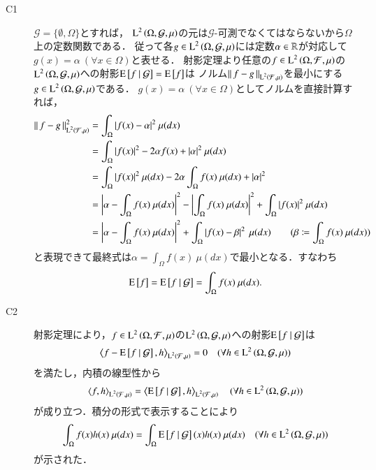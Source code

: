 	\begin{prf}
		\begin{description}
			\item[C1] $\mathcal{G} = \{\emptyset, \Omega\}$とすれば，
				$\operatorname{L}^{2} \left(\Omega, \mathcal{G},\mu\right)$の元は$\mathcal{G}$-可測でなくてはならないから$\Omega$上の定数関数である．
				従って各$g \in \operatorname{L}^{2} \left(\Omega, \mathcal{G},\mu\right)$には定数$\alpha \in \mathbb{R}$が対応して$g(x)=\alpha\ (\forall x \in \Omega)$と表せる．
				射影定理より任意の$f \in \operatorname{L}^{2} \left(\Omega, \mathcal{F},\mu\right)$の$\operatorname{L}^{2} \left(\Omega, \mathcal{G},\mu\right)$への射影$\operatorname{E} \left[ f \ \middle|\ \mathcal{G} \right] = \operatorname{E} \left[ f \right]$は
				ノルム$\left\|\, f-g\, \right\|_{\operatorname{L}^{2} \left(\mathcal{F},\mu\right)}$を最小にする$g \in \operatorname{L}^{2} \left(\Omega, \mathcal{G},\mu\right)$である．
				$g(x)=\alpha\ (\forall x \in \Omega)$としてノルムを直接計算すれば，
				\begin{align}
					\left\|\, f-g\, \right\|_{\operatorname{L}^{2} \left(\mathcal{F},\mu\right)}^2 &= \int_{\Omega} |f(x) - \alpha|^2\ \mu(dx) \\
					&= \int_{\Omega} |f(x)|^2 - 2 \alpha f(x) + |\alpha|^2\ \mu(dx) \\
					&= \int_{\Omega} |f(x)|^2\ \mu(dx) - 2 \alpha \int_{\Omega} f(x)\ \mu(dx) + |\alpha|^2 \\
					&= \left| \alpha - \int_{\Omega} f(x)\ \mu(dx) \right|^2 - \left| \int_{\Omega} f(x)\ \mu(dx) \right|^2 + \int_{\Omega} |f(x)|^2\ \mu(dx) \\
					&= \left| \alpha - \int_{\Omega} f(x)\ \mu(dx) \right|^2 + \int_{\Omega} \left| f(x) - \beta \right|^2\ \mu(dx) \qquad (\beta \coloneqq \int_{\Omega} f(x)\ \mu(dx))
				\end{align}
				と表現できて最終式は$\alpha = \int_{\Omega} f(x)\ \mu(dx)$で最小となる．すなわち
				\begin{align}
					\operatorname{E} \left[ f \right] = \operatorname{E} \left[ f \ \middle|\ \mathcal{G} \right] = \int_{\Omega} f(x)\ \mu(dx).
				\end{align}
			
			\item[C2] 
				射影定理により，$f \in \operatorname{L}^{2} \left(\Omega, \mathcal{F},\mu\right)$の$\operatorname{L}^{2} \left(\Omega, \mathcal{G},\mu\right)$への射影$\operatorname{E} \left[ f \ \middle|\ \mathcal{G} \right]$は
				\begin{align}
					\inprod<f - \cexp{f}{\mathcal{G}}, h>_{\Lp{2}{\mathcal{F},\mu}} = 0 \quad (\forall h \in \Lp{2}{\Omega, \mathcal{G},\mu})
				\end{align}
				を満たし，内積の線型性から
				\begin{align}
					\inprod<f, h>_{\Lp{2}{\mathcal{F},\mu}} = \inprod<\cexp{f}{\mathcal{G}}, h>_{\Lp{2}{\mathcal{F},\mu}} \quad (\forall h \in \Lp{2}{\Omega, \mathcal{G},\mu})
				\end{align}
				が成り立つ．積分の形式で表示することにより
				\begin{align}
					\int_{\Omega} f(x)h(x)\ \mu(dx) = \int_{\Omega} \operatorname{E} \left[ f \ \middle|\ \mathcal{G} \right](x)h(x)\ \mu(dx) \quad (\forall h \in \operatorname{L}^{2} \left(\Omega, \mathcal{G},\mu\right))
				\end{align}
				が示された．
				

\end{description}
\end{prf}
